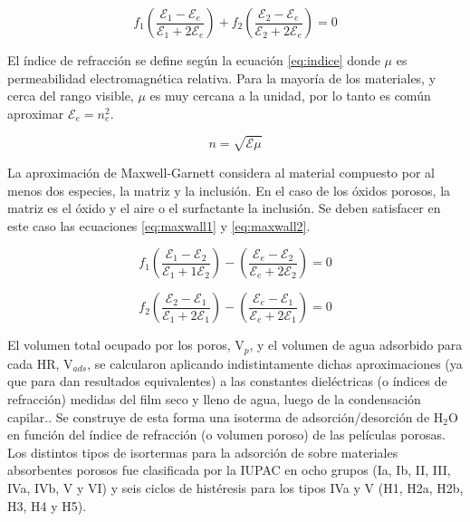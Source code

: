 				\begin{equation}
				 f_1\left(\frac{\mathcal{E}_1-\mathcal{E}_e}{\mathcal{E}_1+2\mathcal{E}_e}\right)+
				 f_2\left(\frac{\mathcal{E}_2-\mathcal{E}_e}{\mathcal{E}_2+2\mathcal{E}_e}\right)=0
			     \label{eq:bruggeman}
				 \end{equation}
		
		El índice de refracción se define según la ecuación \ref{eq:indice} donde $\mu$ es permeabilidad electromagnética relativa. Para la mayoría de los materiales, y cerca del rango visible, $\mu$ es muy cercana a la unidad, por lo tanto es común aproximar $\mathcal{E}_e=n_e^2$.
		
						\begin{equation}
					 	   n=\sqrt{\mathcal{E}\mu}
					 	   \label{eq:indice}
						\end{equation}
		
		La aproximación de Maxwell-Garnett considera al material compuesto por al menos dos especies, la matriz y la inclusión. En el caso de los óxidos porosos, la matriz es el óxido y el aire o el surfactante la inclusión. Se deben satisfacer en este caso las ecuaciones \ref{eq:maxwall1} y \ref{eq:maxwall2}.
				
							\begin{equation}
					 		   	 f_1\left(\frac{\mathcal{E}_1-\mathcal{E}_2}{\mathcal{E}_1+1\mathcal{E}_2}\right)-
					 		   	 \left(\frac{\mathcal{E}_e-\mathcal{E}_2}{\mathcal{E}_e+2\mathcal{E}_2}\right)=0
					 		     \label{eq:maxwall1}
								\end{equation}
						
								\begin{equation}
					 		   	 f_2\left(\frac{\mathcal{E}_2-\mathcal{E}_1}{\mathcal{E}_1+2\mathcal{E}_1}\right)-
					 		   	 \left(\frac{\mathcal{E}_e-\mathcal{E}_1}{\mathcal{E}_e+2\mathcal{E}_1}\right)=0
					 		     \label{eq:maxwall2}
								\end{equation}
		
		El volumen total ocupado por los poros, V$_p$, y el volumen de agua adsorbido para cada HR, V$_{ads}$, se calcularon aplicando indistintamente dichas aproximaciones (ya que para \pdm\space dan resultados equivalentes) a las constantes dieléctricas (o índices de refracción) medidas del film seco y lleno de agua, luego de la condensación capilar.\cite{Angelome2008,Fuertes2009,Nano-compuestas2013}. Se construye de esta forma una isoterma de adsorción/desorción de H$_2$O en función del índice de refracción (o volumen poroso) de las películas porosas. Los distintos tipos de isortermas para la adsorción de sobre materiales absorbentes porosos fue clasificada por la IUPAC en ocho grupos (Ia, Ib, II, III, IVa, IVb, V y VI) y seis ciclos de histéresis para los tipos IVa y V (H1, H2a, H2b, H3, H4 y H5). \cite{Thommes2015}

